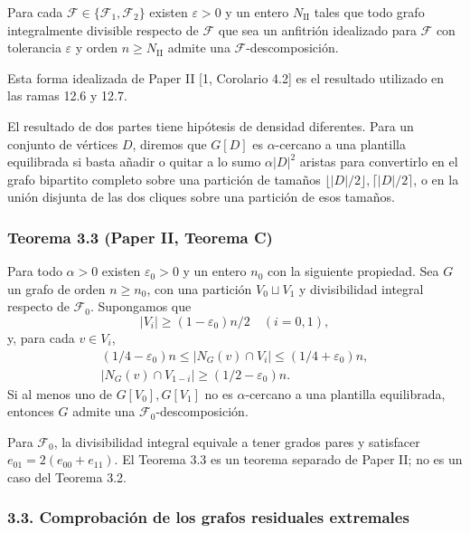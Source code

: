 \documentclass[spanish,11pt,a4paper]{article}
\begin{document}
Para cada \(\mathcal F\in\{\mathcal F_1,\mathcal F_2\}\) existen \(\varepsilon>0\) y un entero \(N_{\mathrm{II}}\) tales que todo grafo integralmente divisible respecto de \(\mathcal F\) que sea un anfitrión idealizado para \(\mathcal F\) con tolerancia \(\varepsilon\) y orden \(n\ge N_{\mathrm{II}}\) admite una \(\mathcal F\)-descomposición.

Esta forma idealizada de Paper II {[}1, Corolario 4.2{]} es el resultado utilizado en las ramas 12.6 y 12.7.

El resultado de dos partes tiene hipótesis de densidad diferentes. Para un conjunto de vértices \(D\), diremos que \(G[D]\) es \(\alpha\)-cercano a una plantilla equilibrada si basta añadir o quitar a lo sumo \(\alpha|D|^2\) aristas para convertirlo en el grafo bipartito completo sobre una partición de tamaños \(\lfloor|D|/2\rfloor,\lceil|D|/2\rceil\), o en la unión disjunta de las dos cliques sobre una partición de esos tamaños.

\subsubsection{Teorema 3.3 (Paper II, Teorema C)}\label{teorema-3.3-paper-ii-teorema-c}

Para todo \(\alpha>0\) existen \(\varepsilon_0>0\) y un entero \(n_0\) con la siguiente propiedad. Sea \(G\) un grafo de orden \(n\ge n_0\), con una partición \(V_0\sqcup V_1\) y divisibilidad integral respecto de \(\mathcal F_0\). Supongamos que \[|V_i|\ge(1-\varepsilon_0)n/2\quad(i=0,1),
\tag{3.4}\] y, para cada \(v\in V_i\), \[\begin{gathered}
(1/4-\varepsilon_0)n\le|N_G(v)\cap V_i|\le(1/4+\varepsilon_0)n,\\
|N_G(v)\cap V_{1-i}|\ge(1/2-\varepsilon_0)n.
\end{gathered}
\tag{3.5}\] Si al menos uno de \(G[V_0],G[V_1]\) no es \(\alpha\)-cercano a una plantilla equilibrada, entonces \(G\) admite una \(\mathcal F_0\)-descomposición.

Para \(\mathcal F_0\), la divisibilidad integral equivale a tener grados pares y satisfacer \(e_{01}=2(e_{00}+e_{11})\). El Teorema 3.3 es un teorema separado de Paper II; no es un caso del Teorema 3.2.

\subsubsection{3.3. Comprobación de los grafos residuales extremales}\label{comprobaciuxf3n-de-los-grafos-residuales-extremales}
\end{document}
